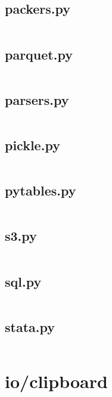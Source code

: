 \documentclass{article}
\begin{document}
\subsection{packers.py}
\inputminted{python}{/home/dufferzafar/dev/@clones/pandas/pandas/io/packers.py}
\newpage

\subsection{parquet.py}
\inputminted{python}{/home/dufferzafar/dev/@clones/pandas/pandas/io/parquet.py}
\newpage

\subsection{parsers.py}
\inputminted{python}{/home/dufferzafar/dev/@clones/pandas/pandas/io/parsers.py}
\newpage

\subsection{pickle.py}
\inputminted{python}{/home/dufferzafar/dev/@clones/pandas/pandas/io/pickle.py}
\newpage

\subsection{pytables.py}
\inputminted{python}{/home/dufferzafar/dev/@clones/pandas/pandas/io/pytables.py}
\newpage

\subsection{s3.py}
\inputminted{python}{/home/dufferzafar/dev/@clones/pandas/pandas/io/s3.py}
\newpage

\subsection{sql.py}
\inputminted{python}{/home/dufferzafar/dev/@clones/pandas/pandas/io/sql.py}
\newpage

\subsection{stata.py}
\inputminted{python}{/home/dufferzafar/dev/@clones/pandas/pandas/io/stata.py}
\newpage

\section{io/clipboard}
\end{document}
